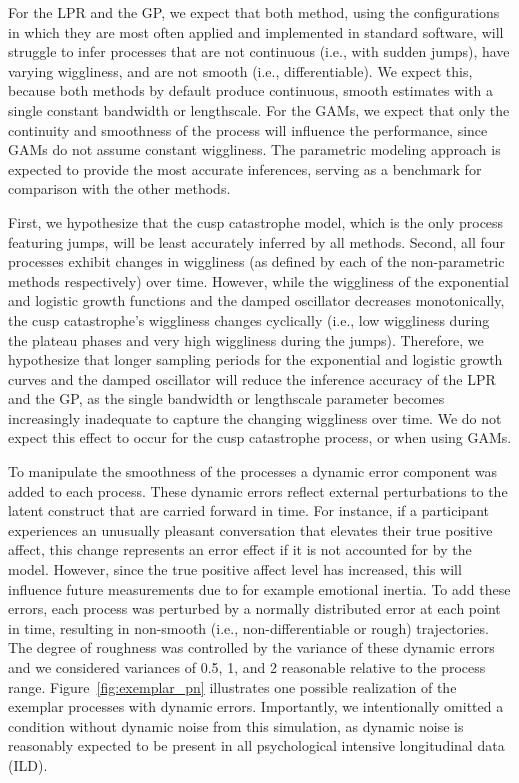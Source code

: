 \documentclass[man, floatsintext]{apa7}
\begin{document}
For the LPR and the GP, we expect that both method, using the configurations in
which they are most often applied and implemented in standard software, will
struggle to infer processes that are not continuous (i.e., with sudden jumps),
have varying wiggliness, and are not smooth (i.e., differentiable). We expect
this, because both methods by default produce continuous, smooth estimates with
a single constant bandwidth or lengthscale. For the GAMs, we expect that only
the continuity and smoothness of the process  will influence the performance,
since GAMs do not assume constant wiggliness. The parametric modeling approach
is expected to provide the most accurate inferences, serving as a benchmark for
comparison with the other methods.

First, we hypothesize that the cusp catastrophe model, which is the only
process featuring jumps, will be least accurately inferred by all methods.
Second, all four processes exhibit changes in wiggliness (as defined by each of
the non-parametric methods respectively) over time. However, while the
wiggliness of the exponential and logistic growth functions and the damped
oscillator decreases monotonically, the cusp catastrophe's wiggliness changes
cyclically (i.e., low wiggliness during the plateau phases and very high
wiggliness during the jumps). Therefore, we hypothesize that longer sampling
periods for the exponential and logistic growth curves and the damped
oscillator will reduce the inference accuracy of the LPR and the GP, as the
single bandwidth or lengthscale parameter becomes increasingly inadequate to
capture the changing wiggliness over time. We do not expect this effect to
occur for the cusp catastrophe process, or when using GAMs.

To manipulate the smoothness of the processes a dynamic error component was
added to each process. These dynamic errors reflect external perturbations to
the latent construct that are carried forward in time. For instance, if a
participant experiences an unusually pleasant conversation that elevates their
true positive affect, this change represents an error effect if it is not
accounted for by the model. However, since the true positive affect level has
increased, this will influence future measurements due to for example emotional
inertia. To add these errors, each process was perturbed by a normally
distributed error at each point in time, resulting in non-smooth (i.e.,
non-differentiable or rough) trajectories. The degree of roughness was
controlled by the variance of these dynamic errors and we considered variances
of 0.5, 1, and 2 reasonable relative to the process range.
Figure~\ref{fig:exemplar_pn} illustrates one possible realization of the
exemplar processes with dynamic errors. Importantly, we intentionally omitted a
condition without dynamic noise from this simulation, as dynamic noise is
reasonably expected to be present in all psychological intensive longitudinal
data (ILD).
\end{document}

